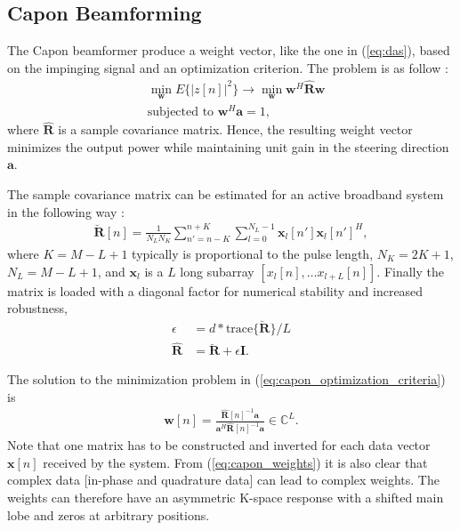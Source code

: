 \documentclass[draftcls]{IEEEtran}
\newcommand{\mat}[1]{\mathbf{#1}}
\renewcommand{\vec}[1]{\mathbf{#1}}
\begin{document}
\subsection{Capon Beamforming}
The Capon beamformer produce a weight vector, like the one in (\ref{eq:das}), based on the impinging signal and an optimization criterion. The problem is as follow \cite{Capon1969}:
\begin{align}
&\min_{\vec{w}} E\{|z[n]|^2\} \rightarrow \min_{\vec{w}} \vec{w}^H \mat{\hat{R}} \vec{w} \label{eq:capon_optimization_criteria} \\
&\text{subjected to } \vec{w}^H\vec{a} = 1,
\end{align}
where $\mat{\hat{R}}$ is a sample covariance matrix. Hence, the resulting weight vector minimizes the output power while maintaining unit gain in the steering direction $\vec{a}$. %

The sample covariance matrix can be estimated for an active broadband system in the following way \cite{Synnevag2009}:
\begin{align}
\mat{\breve{R}}[n] = \frac{1}{N_LN_K}\sum_{n'=n-K}^{n+K} \sum_{l=0}^{N_L-1} \vec{x}_l[n']\vec{x}_l[n']^H,
\end{align}
where $K = M-L+1$ typically is proportional to the pulse length, $N_K = 2K + 1$, $N_L = M-L+1$, and $\vec{x}_l$ is a $L$ long subarray $[x_l[n], \dotso x_{l+L}[n]]$. Finally the matrix is loaded with a diagonal factor for numerical stability and increased robustness, 
\begin{align}
\epsilon &= d*\text{trace}\{\mat{\breve{R}}\}/L\\
\mat{\hat{R}} &= \mat{\breve{R}} + \epsilon\mat{I}.
\end{align} 

The solution to the minimization problem in (\ref{eq:capon_optimization_criteria}) is
\begin{align}\label{eq:capon_weights}
\vec{w}[n] = \frac{\mat{\hat{R}}[n]^{-1}\vec{a}}{\vec{a}^H\mat{\hat{R}}[n]^{-1}\vec{a}} \in \mathbb{C}^L.
\end{align}
Note that one matrix has to be constructed and inverted for each data vector $\vec{x}[n]$ received by the system. %
From (\ref{eq:capon_weights}) it is also clear that complex data [in-phase and quadrature data] can lead to complex weights. The weights can therefore have an asymmetric K-space response with a shifted main lobe and zeros at arbitrary positions. %
\end{document}
